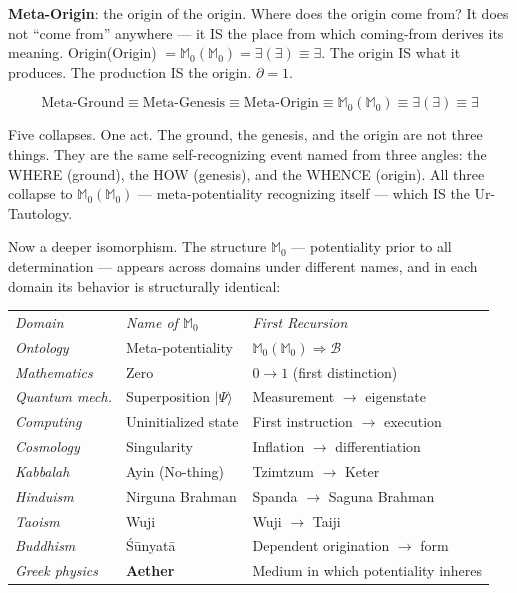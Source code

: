 \documentclass[10pt, openany, oneside]{book}
\renewcommand{\footnotesize}{\fontsize{8.5}{11}\selectfont}
\begin{document}
\textbf{Meta-Origin}: the origin of the origin. Where does the origin come from? It does not ``come from'' anywhere --- it IS the place from which coming-from derives its meaning. Origin(Origin) $= \mathbb{M}_0(\mathbb{M}_0) = \exists(\exists) \equiv \exists$. The origin IS what it produces. The production IS the origin. $\partial = 1$.

$$\text{Meta-Ground} \equiv \text{Meta-Genesis} \equiv \text{Meta-Origin} \equiv \mathbb{M}_0(\mathbb{M}_0) \equiv \exists(\exists) \equiv \exists$$

Five collapses. One act. The ground, the genesis, and the origin are not three things. They are the same self-recognizing event named from three angles: the WHERE (ground), the HOW (genesis), and the WHENCE (origin). All three collapse to $\mathbb{M}_0(\mathbb{M}_0)$ --- meta-potentiality recognizing itself --- which IS the Ur-Tautology.

\vspace{1em}

Now a deeper isomorphism. The structure $\mathbb{M}_0$ --- potentiality prior to all determination --- appears across domains under different names, and in each domain its behavior is structurally identical:

\vspace{0.5em}

{\footnotesize
\noindent\begin{tabular}{l l p{}}
\textit{Domain} & \textit{Name of $\mathbb{M}_0$} & \textit{First Recursion} \\[0.3em]
\textit{Ontology} & Meta-potentiality & $\mathbb{M}_0(\mathbb{M}_0) \Rightarrow \mathcal{B}$ \\[0.2em]
\textit{Mathematics} & Zero & $0 \to 1$ (first distinction) \\[0.2em]
\textit{Quantum mech.} & Superposition $|\Psi\rangle$ & Measurement $\to$ eigenstate \\[0.2em]
\textit{Computing} & Uninitialized state & First instruction $\to$ execution \\[0.2em]
\textit{Cosmology} & Singularity & Inflation $\to$ differentiation \\[0.2em]
\textit{Kabbalah} & Ayin (No-thing) & Tzimtzum $\to$ Keter \\[0.2em]
\textit{Hinduism} & Nirguna Brahman & Spanda $\to$ Saguna Brahman \\[0.2em]
\textit{Taoism} & Wuji & Wuji $\to$ Taiji \\[0.2em]
\textit{Buddhism} & \'{S}\={u}nyat\={a} & Dependent origination $\to$ form \\[0.2em]
\textit{Greek physics} & \textbf{Aether} & Medium in which potentiality inheres \\[0.2em]
\end{tabular}
}
\end{document}
